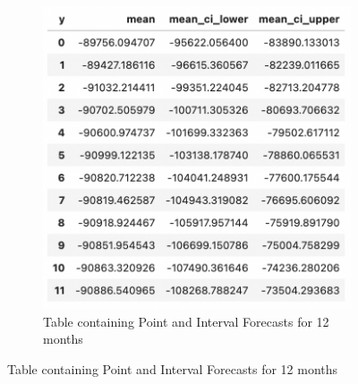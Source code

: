\documentclass[12pt]{article}
\begin{document}
\begin{figure}[H]
	\centering
	\begin{subfigure}{1.0\textwidth}
		\includegraphics[width=\textwidth]{images/table.png}
		\caption*{Table containing Point and Interval Forecasts for 12 months}
	\end{subfigure}
\end{figure}

\pagebreak

\begin{center}
        \textbf{\Large{}}
\end{center}
\end{document}
